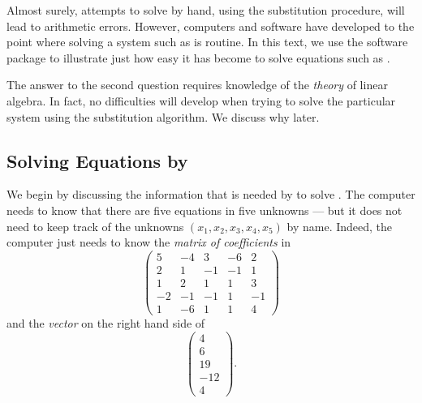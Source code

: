 \documentclass{ximera}
\begin{document}
Almost surely, attempts to solve  by hand,
using the substitution procedure, will lead to arithmetic
errors.  However, computers and software have developed to the
point where solving a system such as  is routine.  In
this text, we use the software package \Matlab to illustrate
just how easy it has become to solve equations such as .

The answer to the second question requires knowledge of the
{\em theory\/} of linear algebra.  In fact, no difficulties will
develop when trying to solve the particular system 
using the substitution algorithm.  We discuss why later.

\subsection*{Solving Equations by \Matlab}

We begin by discussing the information that is needed by \Matlab
to solve .  The computer needs to know that there are
five equations in five unknowns --- but it does not need to keep
track of the unknowns $(x_1,x_2,x_3,x_4,x_5)$ by name.  Indeed,
the computer just needs to know the {\em matrix of
coefficients\/}  in 
\begin{equation*}  \label{bigmatrix}
\left(
\begin{array}{rrrrr}
 5 & -4 &  3 & -6 &  2 \\
 2 &  1 & -1 & -1 &  1 \\
 1 &  2 &  1 &  1 &  3 \\
-2 & -1 & -1 &  1 & -1 \\
 1 & -6 &  1 &  1 &  4
\end{array}
\right)
\end{equation*}
and the {\em vector\/} on the right hand side of 
\begin{equation*} \label{bigRHS}
\left(
\begin{array}{r}
  4 \\
  6 \\
 19 \\
-12 \\
  4
\end{array}
\right).
\end{equation*}
\end{document}
